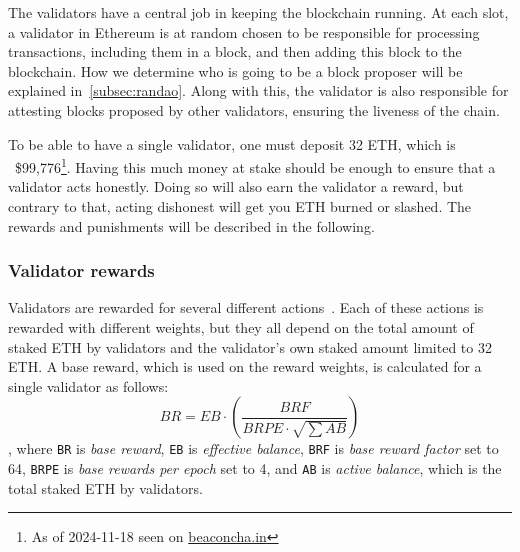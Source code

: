 The validators have a central job in keeping the blockchain running.
At each slot, a validator in Ethereum is at random chosen to be responsible for processing transactions,
including them in a block,
and then adding this block to the blockchain.
How we determine who is going to be a block proposer will be explained in~\autoref{subsec:randao}.
Along with this, the validator is also responsible for attesting blocks proposed by other validators,
ensuring the liveness of the chain.

To be able to have a single validator, one must deposit 32 ETH,
which is ~\$99,776\footnote{As of 2024-11-18 seen on \href{https://beaconcha.in/}{beaconcha.in}}.
Having this much money at stake should be enough to ensure that a validator acts honestly.
Doing so will also earn the validator a reward, but contrary to that,
acting dishonest will get you ETH burned or slashed.
The rewards and punishments will be described in the following.
\subsubsection{Validator rewards}\label{subsubsec:valrewards}
Validators are rewarded for several different actions~\cite{PoSRewAndPen}.
Each of these actions is rewarded with different weights,
but they all depend on the total amount of staked ETH by validators and the validator's own staked amount limited to 32 ETH\@.
A base reward, which is used on the reward weights, is calculated for a single validator as follows:
\begin{equation}
    BR = EB\cdot(\frac{BRF}{BRPE\cdot \sqrt{\sum{AB}}})
    \label{eq:basereward}
\end{equation}, where \texttt{BR} is \textit{base reward},
\texttt{EB} is \textit{effective balance}, \texttt{BRF} is \textit{base reward factor} set to 64,
\texttt{BRPE} is \textit{base rewards per epoch} set to 4,
and \texttt{AB} is \textit{active balance}, which is the total staked ETH by validators.

